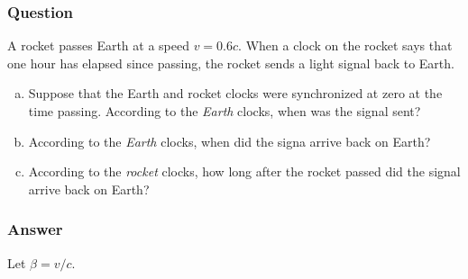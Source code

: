 \subsubsection{Question}

A rocket passes Earth at a speed $v = 0.6c$. When a clock on the rocket says
that one hour has elapsed since passing, the rocket sends a light signal
back to Earth.
\begin{enumerate}[(a)]
    \item
        Suppose that the Earth and rocket clocks were synchronized at zero
        at the time passing. According to the \emph{Earth} clocks, when was
        the signal sent?
    \item
        According to the \emph{Earth} clocks, when did the signa arrive back
        on Earth?
    \item
        According to the \emph{rocket} clocks, how long after the rocket
        passed did the signal arrive back on Earth?
\end{enumerate}

\subsubsection{Answer}

Let $β = v/c$.

